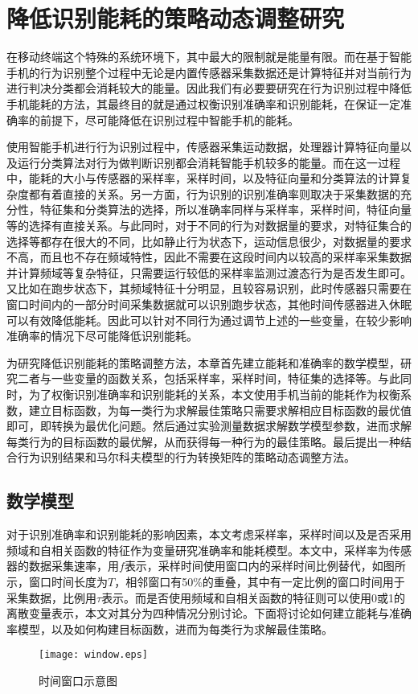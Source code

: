 \chapter{降低识别能耗的策略动态调整研究}
\par 在移动终端这个特殊的系统环境下，其中最大的限制就是能量有限。而在基于智能手机的行为识别整个过程中无论是内置传感器采集数据还是计算特征并对当前行为进行判决分类都会消耗较大的能量。因此我们有必要要研究在行为识别过程中降低手机能耗的方法，其最终目的就是通过权衡识别准确率和识别能耗，在保证一定准确率的前提下，尽可能降低在识别过程中智能手机的能耗。
\par 使用智能手机进行行为识别过程中，传感器采集运动数据，处理器计算特征向量以及运行分类算法对行为做判断识别都会消耗智能手机较多的能量。而在这一过程中，能耗的大小与传感器的采样率，采样时间，以及特征向量和分类算法的计算复杂度都有着直接的关系。另一方面，行为识别的识别准确率则取决于采集数据的充分性，特征集和分类算法的选择，所以准确率同样与采样率，采样时间，特征向量等的选择有直接关系。与此同时，对于不同的行为对数据量的要求，对特征集合的选择等都存在很大的不同，比如静止行为状态下，运动信息很少，对数据量的要求不高，而且也不存在频域特性，因此不需要在这段时间内以较高的采样率采集数据并计算频域等复杂特征，只需要运行较低的采样率监测过渡态行为是否发生即可。又比如在跑步状态下，其频域特征十分明显，且较容易识别，此时传感器只需要在窗口时间内的一部分时间采集数据就可以识别跑步状态，其他时间传感器进入休眠可以有效降低能耗。因此可以针对不同行为通过调节上述的一些变量，在较少影响准确率的情况下尽可能降低识别能耗。
\par 为研究降低识别能耗的策略调整方法，本章首先建立能耗和准确率的数学模型，研究二者与一些变量的函数关系，包括采样率，采样时间，特征集的选择等。与此同时，为了权衡识别准确率和识别能耗的关系，本文使用手机当前的能耗作为权衡系数，建立目标函数，为每一类行为求解最佳策略只需要求解相应目标函数的最优值即可，即转换为最优化问题。然后通过实验测量数据求解数学模型参数，进而求解每类行为的目标函数的最优解，从而获得每一种行为的最佳策略。最后提出一种结合行为识别结果和马尔科夫模型的行为转换矩阵的策略动态调整方法。

\section{数学模型}
\par 对于识别准确率和识别能耗的影响因素，本文考虑采样率，采样时间以及是否采用频域和自相关函数的特征作为变量研究准确率和能耗模型。本文中，采样率为传感器的数据采集速率，用$f$表示，采样时间使用窗口内的采样时间比例替代，如图所示，窗口时间长度为$T$，相邻窗口有50\%的重叠，其中有一定比例的窗口时间用于采集数据，比例用$\tau$表示。而是否使用频域和自相关函数的特征则可以使用0或1的离散变量表示，本文对其分为四种情况分别讨论。下面将讨论如何建立能耗与准确率模型，以及如何构建目标函数，进而为每类行为求解最佳策略。
\begin{figure}[ht]
\centering
\texttt{[image: window.eps]}
\caption{时间窗口示意图}
\end{figure}
